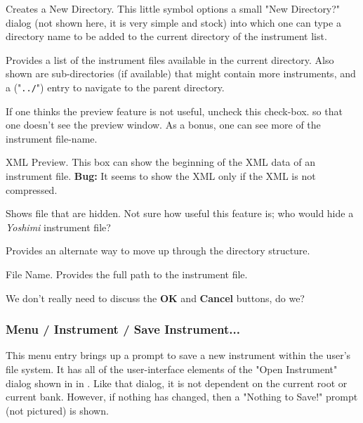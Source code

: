    Creates a New Directory.
   This little symbol options a small "New Directory?" dialog (not shown
   here, it is very simple and stock) into which one can type a directory
   name to be added to the current directory of the instrument list.

   Provides a list of the instrument files available in the current
   directory.  Also shown are sub-directories (if available)
   that might contain more instruments, and a ("\texttt{../}") entry
   to navigate to the parent directory.

   If one thinks the preview feature is not useful, uncheck this check-box.
   so that one doesn't see the preview window.  As a bonus, one can see more
   of the instrument file-name.

   XML Preview.
   This box can show the beginning of the XML data of an instrument file.
   \textbf{Bug:}
   It seems to show the XML only if the XML is not compressed.

   Shows file that are hidden.  Not sure how useful this feature is;
   who would hide a \textsl{Yoshimi} instrument file?

   Provides an alternate way to move up through the directory structure.

   File Name.
   Provides the full path to the instrument file.

   We don't really need to discuss the \textbf{OK} and \textbf{Cancel}
   buttons, do we?

\subsubsection{Menu / Instrument / Save Instrument...}
\label{subsubsec:menu_instrument_save}

   This menu entry brings up a prompt to save a new instrument within the
   user's file system.
   It has all of the user-interface elements of the "Open Instrument"
   dialog shown in
   in .
   Like that dialog, it is not dependent on the current root or current bank.
   However, if nothing has changed, then a "Nothing to Save!" prompt (not
   pictured) is shown.

